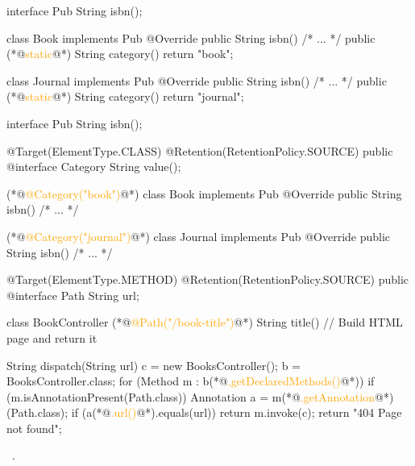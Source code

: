 \documentclass{article}
\begin{document}

\begin{pptWide}{2}
{\scriptsize\begin{ffcode}
interface Pub
  String isbn();

class Book implements Pub
  @Override public String isbn()
    /* ... */
  public (*@\textcolor{orange}{static}@*) String category()
    return "book";

class Journal implements Pub
  @Override public String isbn()
    /* ... */
  public (*@\textcolor{orange}{static}@*) String category()
    return "journal";
\end{ffcode}
}
\par\columnbreak\par
{\scriptsize\begin{ffcode}
interface Pub
  String isbn();

@Target(ElementType.CLASS)
@Retention(RetentionPolicy.SOURCE)
public @interface Category
  String value();

(*@\textcolor{orange}{@Category("book")}@*)
class Book implements Pub
  @Override public String isbn()
    /* ... */

(*@\textcolor{orange}{@Category("journal")}@*)
class Journal implements Pub
  @Override public String isbn()
    /* ... */
\end{ffcode}
}
\end{pptWide}
\par
\plush{}

\begin{pptWide}{2}
{\small\begin{ffcode}
@Target(ElementType.METHOD)
@Retention(RetentionPolicy.SOURCE)
public @interface Path
  String url;

class BookController
  (*@\textcolor{orange}{@Path("/book-title")}@*)
  String title()
    // Build HTML page and return it
\end{ffcode}
}
\par\columnbreak\par
{\scriptsize\begin{ffcode}
String dispatch(String url) {
  c = new BooksController();
  b = BooksController.class;
  for (Method m : b(*@\textcolor{orange}{.getDeclaredMethods()}@*)) {
    if (m.isAnnotationPresent(Path.class)) {
      Annotation a = m(*@\textcolor{orange}{.getAnnotation}@*)(Path.class);
      if (a(*@\textcolor{orange}{.url()}@*).equals(url)) {
        return m.invoke(c);
      }
    }
  }
  return "404 Page not found";
}
\end{ffcode}
}
\end{pptWide}
\par
{}~\citep{bugayenko2016blog0412}.
\plush{}
\end{document}
